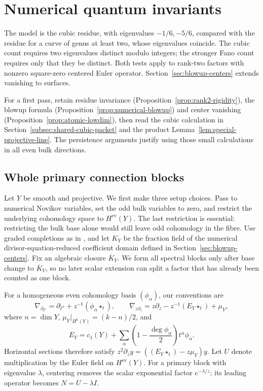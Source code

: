 \section{Numerical quantum invariants}
\label{sec:atomic-one-step}

The model is the cubic residue, with eigenvalues $-1/6,-5/6$, compared
with the residue for a curve of genus at least two, whose eigenvalues coincide.
The cubic count requires two eigenvalues distinct modulo integers;
the stronger Fano count requires only that they be distinct.
Both tests apply to rank-two factors with nonzero square-zero centered
Euler operator. Section~\ref{sec:blowup-centers} extends vanishing to surfaces.

For a first pass, retain residue invariance
(Proposition~\ref{prop:rank2-rigidity}), the blowup formula
(Proposition~\ref{prop:numerical-blowup}) and center vanishing
(Proposition~\ref{prop:atomic-lowdim}), then read the cubic calculation in
Section~\ref{subsec:shared-cubic-packet} and the product
Lemma~\ref{lem:special-projective-line}. The persistence arguments justify
using those small calculations in all even bulk directions.

\subsection{Whole primary connection blocks}

Let \(Y\) be smooth and projective.  We first make three setup choices.
Pass to numerical Novikov variables, set the odd bulk variables to zero, and
restrict the underlying cohomology space to \(H^{\mathrm{ev}}(Y)\).  The
last restriction is essential: restricting the bulk base alone would still
leave odd cohomology in the fibre.  Use graded completions as in
\cite[Section~2.2]{IritaniBlowup}, and let \(K_Y\) be the fraction field of
the numerical divisor-equation-reduced coefficient domain defined in
Section~\ref{sec:blowup-centers}.
Fix an algebraic closure \(\overline K_Y\).  We form
all spectral blocks only after base change to \(\overline K_Y\), so no later
scalar extension can split a factor that has already been counted as one
block.

For a homogeneous even cohomology basis \((\phi_\alpha)\), our conventions are
\[
 \nabla_{\partial_{t^\alpha}}
 =\partial_{t^\alpha}+z^{-1}(\phi_\alpha\star_t),\qquad
 \nabla_{z\partial_z}=z\partial_z-z^{-1}(E_Y\star_t)+\mu_Y,
\]
where \(n=\dim Y\), \(\mu_Y|_{H^k(Y)}=(k-n)/2\), and
\[
 E_Y=c_1(Y)+\sum_\alpha
 \left(1-\frac{\deg\phi_\alpha}{2}\right)t^\alpha\phi_\alpha.
\]
Horizontal sections therefore satisfy
\(z^2\partial_z y=((E_Y\star_t)-z\mu_Y)y\).
Let \(U\) denote multiplication by the Euler field on \(H^{\mathrm{ev}}(Y)\).
For a primary block with eigenvalue \(\lambda\), centering removes the
scalar exponential factor \(e^{-\lambda/z}\); its leading operator becomes
\(N=U-\lambda I\).

